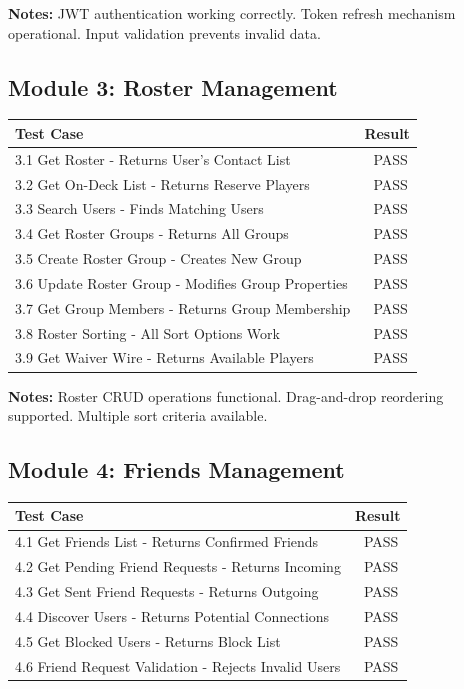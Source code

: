 \documentclass[11pt,a4paper]{article}
\newcommand{\pass}{\textcolor{pass}{\checkmark\ PASS}}
\begin{document}
\vspace{0.5cm}
\textbf{Notes:} JWT authentication working correctly. Token refresh mechanism operational. Input validation prevents invalid data.

\subsection{Module 3: Roster Management}

\begin{tabular}{|p{10cm}|c|}
\hline
\textbf{Test Case} & \textbf{Result} \\
\hline
3.1 Get Roster - Returns User's Contact List & \pass \\
\hline
3.2 Get On-Deck List - Returns Reserve Players & \pass \\
\hline
3.3 Search Users - Finds Matching Users & \pass \\
\hline
3.4 Get Roster Groups - Returns All Groups & \pass \\
\hline
3.5 Create Roster Group - Creates New Group & \pass \\
\hline
3.6 Update Roster Group - Modifies Group Properties & \pass \\
\hline
3.7 Get Group Members - Returns Group Membership & \pass \\
\hline
3.8 Roster Sorting - All Sort Options Work & \pass \\
\hline
3.9 Get Waiver Wire - Returns Available Players & \pass \\
\hline
\end{tabular}

\vspace{0.5cm}
\textbf{Notes:} Roster CRUD operations functional. Drag-and-drop reordering supported. Multiple sort criteria available.


\subsection{Module 4: Friends Management}

\begin{tabular}{|p{10cm}|c|}
\hline
\textbf{Test Case} & \textbf{Result} \\
\hline
4.1 Get Friends List - Returns Confirmed Friends & \pass \\
\hline
4.2 Get Pending Friend Requests - Returns Incoming & \pass \\
\hline
4.3 Get Sent Friend Requests - Returns Outgoing & \pass \\
\hline
4.4 Discover Users - Returns Potential Connections & \pass \\
\hline
4.5 Get Blocked Users - Returns Block List & \pass \\
\hline
4.6 Friend Request Validation - Rejects Invalid Users & \pass \\
\hline
\end{tabular}
\end{document}
